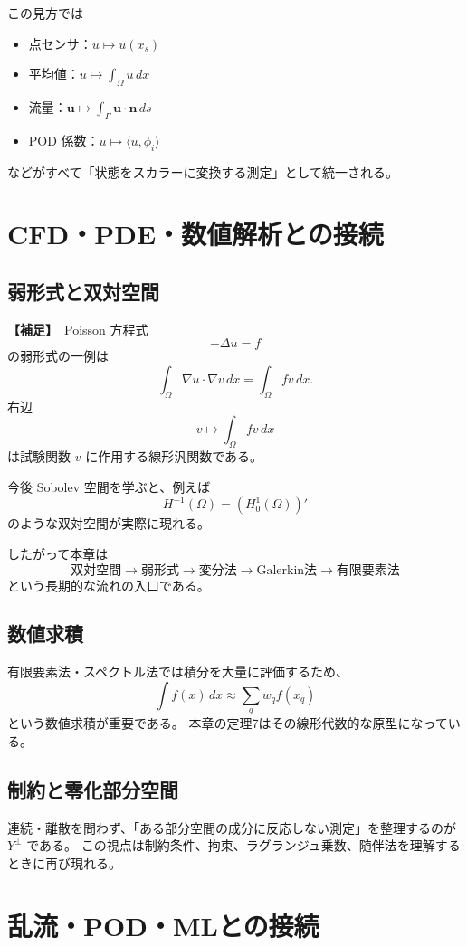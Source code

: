 \documentclass[a4paper,11pt]{ltjsarticle}
\newcommand{\suppitem}{\textbf{【補足】}}
\begin{document}
この見方では
\begin{itemize}
  \item 点センサ：$u\mapsto u(x_s)$
  \item 平均値：$u\mapsto \int_\Omega u\,dx$
  \item 流量：$\bm{u}\mapsto\int_\Gamma \bm{u}\cdot\bm{n}\,ds$
  \item POD 係数：$u\mapsto\langle u,\phi_i\rangle$
\end{itemize}
などがすべて「状態をスカラーに変換する測定」として統一される。

\section{CFD・PDE・数値解析との接続}

\subsection{弱形式と双対空間}
\suppitem\ Poisson 方程式
\[
-\Delta u=f
\]
の弱形式の一例は
\[
\int_\Omega \nabla u\cdot\nabla v\,dx
=
\int_\Omega fv\,dx.
\]
右辺
\[
v\mapsto\int_\Omega fv\,dx
\]
は試験関数 $v$ に作用する線形汎関数である。

今後 Sobolev 空間を学ぶと、例えば
\[
H^{-1}(\Omega)=(H_0^1(\Omega))'
\]
のような双対空間が実際に現れる。

したがって本章は
\[
\boxed{
\text{双対空間}
\to
\text{弱形式}
\to
\text{変分法}
\to
\text{Galerkin法}
\to
\text{有限要素法}
}
\]
という長期的な流れの入口である。

\subsection{数値求積}
有限要素法・スペクトル法では積分を大量に評価するため、
\[
\int f(x)\,dx
\approx
\sum_qw_qf(x_q)
\]
という数値求積が重要である。
本章の定理7はその線形代数的な原型になっている。

\subsection{制約と零化部分空間}
連続・離散を問わず、「ある部分空間の成分に反応しない測定」を整理するのが $Y^\perp$ である。
この視点は制約条件、拘束、ラグランジュ乗数、随伴法を理解するときに再び現れる。

\section{乱流・POD・MLとの接続}
\end{document}
